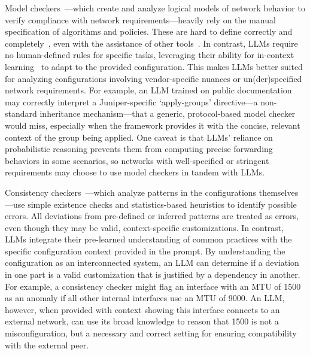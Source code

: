 Model checkers~\cite{fogel2015general, beckett2017general, abhashkumar2020tiramisu, prabhu2020plankton, zhang2022sre, steffen2020netdice, ye2020hoyan, ritchey2000using,al2011configchecker, jeffrey2009model, batfish}---which create and analyze logical models of network behavior to verify compliance with network requirements---heavily rely on the manual specification of algorithms and policies. These are hard to define correctly and completely~\cite{ye2020hoyan, birkner2021metha}, even with the assistance of other tools~\cite{birkner2020config2spec, kheradmand2020anime, sharma2023prosper}. 
In contrast, LLMs require no human-defined rules for specific tasks, leveraging their ability for in-context learning~\cite{brown2020language} to adapt to the provided configuration. 
This makes LLMs better suited for analyzing configurations involving vendor-specific nuances  or un(der)specified network requirements. 
For example, an LLM trained on public documentation may correctly interpret a Juniper-specific `apply-groups' directive—a non-standard inheritance mechanism—that a generic, protocol-based model checker would miss, especially when the framework provides it with the concise, relevant context of the group being applied.
One caveat is that LLMs' reliance on probabilistic reasoning prevents them from computing precise forwarding behaviors in some scenarios, so networks with well-specified or stringent requirements may choose to use model checkers in tandem with LLMs.





Consistency checkers~\cite{kakarla2024diffy,kakarla2020finding, le2006minerals, feamster2005detecting, tang2021campion, le2008detecting, le2006characterization, batfish}---which analyze patterns in the configurations themselves---use simple existence checks and statistics-based heuristics to identify possible errors.
All deviations from pre-defined or inferred patterns are treated as errors, even though they may be valid, context-specific customizations. 
In contrast, LLMs integrate their pre-learned understanding of common practices with the specific configuration context provided in the prompt. By understanding the configuration as an interconnected system, an LLM can determine if a deviation in one part is a valid customization that is justified by a dependency in another. For example, a consistency checker might flag an interface with an MTU of 1500 as an anomaly if all other internal interfaces use an MTU of 9000. An LLM, however, when provided with context showing this interface connects to an external network, can use its broad knowledge to reason that 1500 is not a misconfiguration, but a necessary and correct setting for ensuring compatibility with the external peer.

